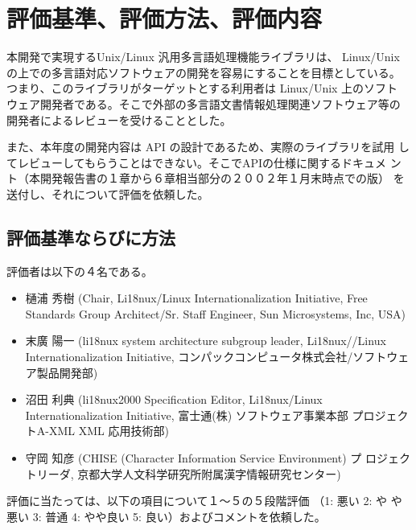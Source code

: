 
\section{評価基準、評価方法、評価内容}

本開発で実現するUnix/Linux 汎用多言語処理機能ライブラリは、 Linux/Unix 
の上での多言語対応ソフトウェアの開発を容易にすることを目標としている。
つまり、このライブラリがターゲットとする利用者は Linux/Unix 上のソフト
ウェア開発者である。そこで外部の多言語文書情報処理関連ソフトウェア等の
開発者によるレビューを受けることとした。

また、本年度の開発内容は API の設計であるため、実際のライブラリを試用
してレビューしてもらうことはできない。そこでAPIの仕様に関するドキュメ
ント（本開発報告書の１章から６章相当部分の２００２年１月末時点での版）
を送付し、それについて評価を依頼した。

\subsection{評価基準ならびに方法}

評価者は以下の４名である。
\begin{itemize}
\item 樋浦 秀樹 (Chair, Li18nux/Linux Internationalization Initiative, Free Standards Group
                Architect/Sr. Staff Engineer, Sun Microsystems, Inc, USA)
\item 末廣 陽一 (li18nux system architecture subgroup leader, Li18nux//Linux
Internationalization Initiative, コンパックコンピュータ株式会社/ソフトウェア製品開発部)
\item 沼田 利典  (li18nux2000 Specification Editor, Li18nux/Linux
Internationalization Initiative, 富士通(株) ソフトウェア事業本部 プロジェクトA-XML XML 応用技術部)
\item 守岡 知彦 (CHISE (Character Information Service Environment) プ
ロジェクトリーダ, 京都大学人文科学研究所附属漢字情報研究センター)
\end{itemize}

評価に当たっては、以下の項目について１〜５の５段階評価 （1: 悪い 2: や
や悪い 3: 普通 4: やや良い 5: 良い）およびコメントを依頼した。


